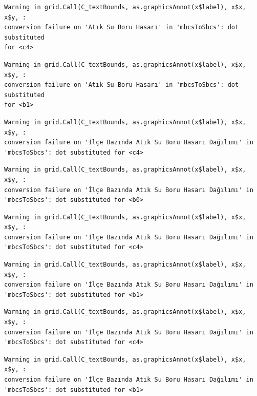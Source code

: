 \documentclass[
  11pt,
  a4paper,
  DIV=11,
  numbers=noendperiod]{scrartcl}
\begin{document}
\begin{verbatim}
Warning in grid.Call(C_textBounds, as.graphicsAnnot(x$label), x$x, x$y, :
conversion failure on 'Atık Su Boru Hasarı' in 'mbcsToSbcs': dot substituted
for <c4>
\end{verbatim}

\begin{verbatim}
Warning in grid.Call(C_textBounds, as.graphicsAnnot(x$label), x$x, x$y, :
conversion failure on 'Atık Su Boru Hasarı' in 'mbcsToSbcs': dot substituted
for <b1>
\end{verbatim}

\begin{verbatim}
Warning in grid.Call(C_textBounds, as.graphicsAnnot(x$label), x$x, x$y, :
conversion failure on 'İlçe Bazında Atık Su Boru Hasarı Dağılımı' in
'mbcsToSbcs': dot substituted for <c4>
\end{verbatim}

\begin{verbatim}
Warning in grid.Call(C_textBounds, as.graphicsAnnot(x$label), x$x, x$y, :
conversion failure on 'İlçe Bazında Atık Su Boru Hasarı Dağılımı' in
'mbcsToSbcs': dot substituted for <b0>
\end{verbatim}

\begin{verbatim}
Warning in grid.Call(C_textBounds, as.graphicsAnnot(x$label), x$x, x$y, :
conversion failure on 'İlçe Bazında Atık Su Boru Hasarı Dağılımı' in
'mbcsToSbcs': dot substituted for <c4>
\end{verbatim}

\begin{verbatim}
Warning in grid.Call(C_textBounds, as.graphicsAnnot(x$label), x$x, x$y, :
conversion failure on 'İlçe Bazında Atık Su Boru Hasarı Dağılımı' in
'mbcsToSbcs': dot substituted for <b1>
\end{verbatim}

\begin{verbatim}
Warning in grid.Call(C_textBounds, as.graphicsAnnot(x$label), x$x, x$y, :
conversion failure on 'İlçe Bazında Atık Su Boru Hasarı Dağılımı' in
'mbcsToSbcs': dot substituted for <c4>
\end{verbatim}

\begin{verbatim}
Warning in grid.Call(C_textBounds, as.graphicsAnnot(x$label), x$x, x$y, :
conversion failure on 'İlçe Bazında Atık Su Boru Hasarı Dağılımı' in
'mbcsToSbcs': dot substituted for <b1>
\end{verbatim}
\end{document}
